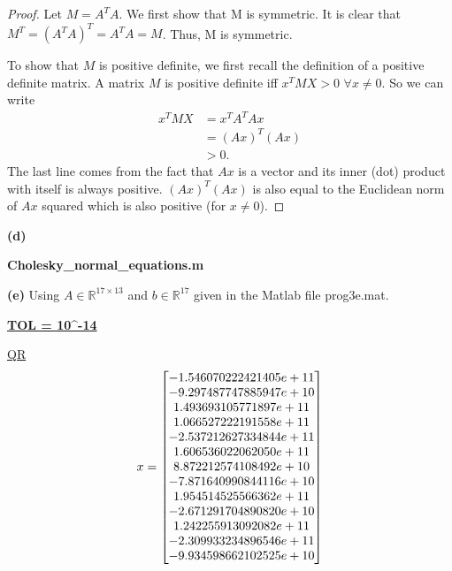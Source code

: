\documentclass[final,12pt,reqno]{amsart}
\begin{document}
\begin{proof}
Let $M = A^TA$. We first show that M is symmetric. It is clear that $M^T = (A^TA)^T = A^TA = M$. Thus, M is symmetric.

To show that $M$ is positive definite, we first recall the definition of a positive definite matrix. A matrix $M$ is positive definite iff $x^TMX > 0$ $\forall x\neq 0$. So we can write
\begin{align*}
	x^TMX &= x^TA^TAx\\
				&= (Ax)^T(Ax)\\
				&> 0.
\end{align*}
The last line comes from the fact that $Ax$ is a vector and its inner (dot) product with itself is always positive. $(Ax)^T(Ax)$ is also equal to the Euclidean norm of $Ax$ squared which is also positive (for $x \neq 0$).
\end{proof}

\newpage

\textbf{(d)}

\textbf{Cholesky\_normal\_equations.m}


\newpage

\textbf{(e)} Using $A\in \mathbb{R}^{17\times 13}$ and $b\in \mathbb{R}^{17}$ given in the Matlab file prog3e.mat.

\textbf{\underline{TOL = 10^{-14}}}

\underline{QR}
\[
x =
\left[\begin{array}{@{}*{1}{c}@{}}
    -1.546070222421405e+11\\
    -9.297487747885947e+10\\
     1.493693105771897e+11\\
     1.066527222191558e+11\\
    -2.537212627334844e+11\\
     1.606536022062050e+11\\
     8.872212574108492e+10\\
    -7.871640990844116e+10\\
     1.954514525566362e+11\\
    -2.671291704890820e+10\\
     1.242255913092082e+11\\
    -2.309933234896546e+11\\
    -9.934598662102525e+10
  \end{array} \right]
\]
\end{document}
